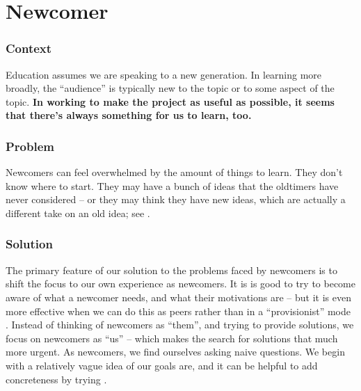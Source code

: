 

\section{Newcomer}\label{sec:Newcomer}

\subsubsection*{Context}
Education assumes we are speaking to a new generation. 
In learning more broadly, the ``audience'' is typically new to the topic or to some aspect of the topic.
\textbf{In working to make the project as useful as possible, it seems that there's always something for us to learn, too.}

\subsubsection*{Problem} Newcomers can feel overwhelmed by the amount of things to learn.  They
don't know where to start.  They may have a bunch of ideas that the
oldtimers have never considered -- or they may think they have new
ideas, which are actually a different take on an old idea; see
.

\subsubsection*{Solution}
The primary feature of our solution to the problems faced by newcomers
is to shift the focus to our own experience as newcomers.
It is is good to try to become aware of what a newcomer needs, and what their
motivations are -- but it is even more effective when we can do this as peers rather than
in a ``provisionist'' mode \cite{boud2005peer}.  Instead of
thinking of newcomers as ``them'', and trying to provide solutions, we focus
on newcomers as ``us'' -- which makes the search for solutions that much more urgent. 
As newcomers, we find ourselves asking naive questions.
We begin with a relatively vague idea of our goals are, 
and it can be helpful to add concreteness by trying .

